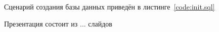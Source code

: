 Сценарий создания базы данных приведён в листинге~\ref{code:init.sql}

\clearpage
{}
Презентация состоит из ... слайдов